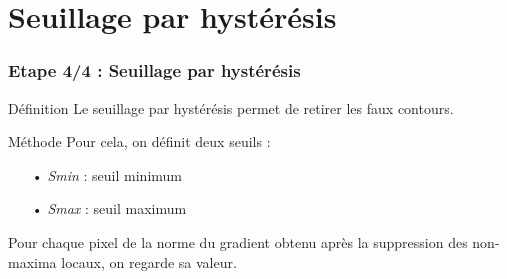 \documentclass{beamer}
\begin{document}
\section{Seuillage par hystérésis}

\begin{frame}
\frametitle{Etape 4/4 : Seuillage par hystérésis}

\begin{block}{Définition}
Le seuillage par hystérésis permet de retirer les faux contours.
\end{block}

\begin{block}{Méthode}
Pour cela, on définit deux seuils : 
\begin{itemize}
\item[•] \emph{Smin} : seuil minimum
\item[•] \emph{Smax} : seuil maximum \\
\end{itemize}

Pour chaque pixel de la norme du gradient obtenu après la suppression des non-maxima locaux, on regarde sa valeur.
\end{block}
\end{frame}
\end{document}
